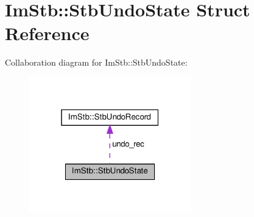 \hypertarget{structImStb_1_1StbUndoState}{}\section{Im\+Stb\+:\+:Stb\+Undo\+State Struct Reference}
\label{structImStb_1_1StbUndoState}


Collaboration diagram for Im\+Stb\+:\+:Stb\+Undo\+State\+:\nopagebreak
\begin{figure}[H]
\begin{center}
\leavevmode
\includegraphics[width=199pt]{structImStb_1_1StbUndoState__coll__graph}
\end{center}
\end{figure}
